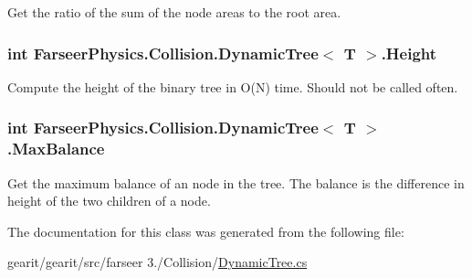 Get the ratio of the sum of the node areas to the root area. 

\hypertarget{class_farseer_physics_1_1_collision_1_1_dynamic_tree_3_01_t_01_4_aa6edeb5506f3a8230b02241f7ede0e7c}{
\subsubsection[{Height}]{\setlength{\rightskip}{0pt plus 5cm}int Farseer\+Physics.\+Collision.\+Dynamic\+Tree$<$ T $>$.Height\hspace{0.3cm}{\ttfamily [get]}}}\label{class_farseer_physics_1_1_collision_1_1_dynamic_tree_3_01_t_01_4_aa6edeb5506f3a8230b02241f7ede0e7c}


Compute the height of the binary tree in O(\+N) time. Should not be called often. 

\hypertarget{class_farseer_physics_1_1_collision_1_1_dynamic_tree_3_01_t_01_4_ac53449e098d2d8012465ee88f3ce3385}{
\subsubsection[{Max\+Balance}]{\setlength{\rightskip}{0pt plus 5cm}int Farseer\+Physics.\+Collision.\+Dynamic\+Tree$<$ T $>$.Max\+Balance\hspace{0.3cm}{\ttfamily [get]}}}\label{class_farseer_physics_1_1_collision_1_1_dynamic_tree_3_01_t_01_4_ac53449e098d2d8012465ee88f3ce3385}


Get the maximum balance of an node in the tree. The balance is the difference in height of the two children of a node. 



The documentation for this class was generated from the following file\+:\begin{DoxyCompactItemize}
\item 
gearit/gearit/src/farseer 3./\+Collision/\hyperlink{_dynamic_tree_8cs}{Dynamic\+Tree.\+cs}\end{DoxyCompactItemize}
